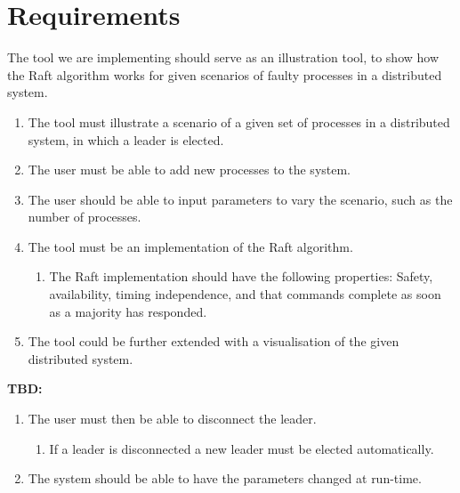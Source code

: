 \section{Requirements} %
\label{sec:requirements}


The tool we are implementing should serve as an illustration tool, to show how the Raft algorithm works for given scenarios of faulty processes in a distributed system.

\begin{enumerate}
\item The tool must illustrate a scenario of a given set of processes in a distributed system, in which a leader is elected.
\item The user must be able to add new processes to the system.
\item The user should be able to input parameters to vary the scenario, such as the number of processes.
\item The tool must be an implementation of the Raft algorithm.
	\begin{enumerate}
	\item The Raft implementation should have the following properties: Safety, availability, timing independence, and that commands complete as soon as a majority has responded.
	\end{enumerate}
\item The tool could be further extended with a visualisation of the given distributed system.
\end{enumerate}
\textbf{TBD:}
\begin{enumerate}
\item The user must then be able to disconnect the leader.
	\begin{enumerate}
	\item If a leader is disconnected a new leader must be elected automatically.
	\end{enumerate}
\item The system should be able to have the parameters changed at run-time.
\end{enumerate}

